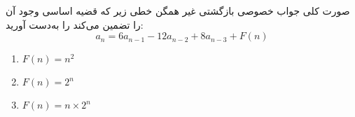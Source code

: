 	\p
صورت کلی جواب خصوصی بازگشتی غیر همگن خطی زیر که قضیه اساسی وجود آن را تضمین می‌کند را به‌دست آورید:
$$a_n = 6a_{n-1} - 12a_{n-2} + 8a_{n-3} + F(n)$$
\begin{enumerate}
\item
$ F(n) = n^{2} $
\item
$F(n) = 2^n$
\item
$F(n) = n \times 2^n$
\end{enumerate}
